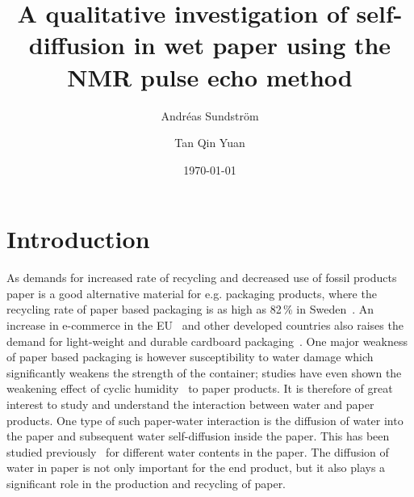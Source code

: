 \documentclass[11pt,a4paper, twocolumn,
swedish, english %
]{article}
\begin{document}


\title{A qualitative investigation of self-diffusion in wet
  paper using the NMR pulse echo method} 
\author{Andréas Sundström \and Tan Qin Yuan}
\date{\today}

\twocolumn[
\begin{@twocolumnfalse}
\maketitle
\begin{abstract}

\end{abstract}
\end{@twocolumnfalse}
]



\section{Introduction}

As demands for increased rate of recycling and decreased use of fossil
products paper is a good alternative material for e.g. packaging
products, where the recycling rate of paper based packaging is as high
as 82\,\% in Sweden~\cite{Adolfson_NVV2016}. An increase in e-commerce
in the EU~\cite{eurostat_e-commerce2017} and other developed countries
also raises the demand for light-weight and durable cardboard
packaging~\cite{Nordstrand2003}. One major weakness of paper based 
packaging is however susceptibility to water damage which
significantly weakens the strength of the container; studies have even
shown the weakening effect of cyclic
humidity~\cite{Sorensen-Hoffmann2004} to paper products. It is 
therefore of great interest to study and understand the interaction
between water and paper products. 
One type of such paper-water interaction is the diffusion of water
into the paper and subsequent water self-diffusion inside the 
paper. This has been studied previously~\cite{Perkins-Batchelor2012,
  Li-etal1992, Topgaard-Soderman2001} for different water contents in
the paper. The diffusion of water in paper is not only important for
the end product, but it also plays a significant role in the
production and recycling of paper.
\end{document}
